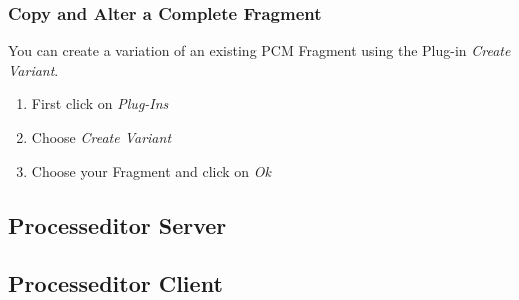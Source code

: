 \documentclass{acm_proc_article-sp}
\begin{document}
\subsubsection{Copy and Alter a Complete
Fragment}\label{copy-and-alter-a-complete-fragment}

You can create a variation of an existing PCM Fragment using the Plug-in
\emph{Create Variant}.

\begin{enumerate}
\def\labelenumi{\arabic{enumi}.}
\itemsep1pt\parskip0pt
\item
  First click on \emph{Plug-Ins}
\item
  Choose \emph{Create Variant}
\item
  Choose your Fragment and click on \emph{Ok}
\end{enumerate}


%
%
\subsection{Processeditor Server}


%
%
\subsection{Processeditor Client}


%
%

%
 

%
%
\end{document}
